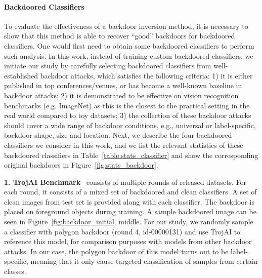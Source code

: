 \documentclass[10pt,twocolumn,letterpaper]{article}
\begin{document}
\paragraph{Backdoored Classifiers} To evaluate the effectiveness of a backdoor inversion method, it is necessary to show that this method is able to recover ``good'' backdoors for backdoored classifiers. One would first need to obtain some backdoored classifiers to perform such analysis. In this work, instead of training custom backdoored classifiers, we initiate our study by carefully selecting backdoored classifiers from well-established backdoor attacks, which satisfies the following criteria: 1) it is either published in top conferences/venues, or has become a well-known baseline in backdoor attacks; 2) it is demonstrated to be effective on  vision recognition benchmarks (e.g. ImageNet) as this is the closest to the practical setting in the real world compared to toy datasets; 3) the collection of these backdoor attacks should cover a wide range of backdoor conditions, e.g., universal or label-specific, backdoor shape, size and location. Next, we describe the four backdoored classifiers we consider in this work, and we list the relevant statistics of these backdoored classifiers in Table~\ref{table:stats_classifier} and show the corresponding original backdoors in Figure~\ref{fig:stats_backdoor}.  

\noindent \textbf{1. TrojAI Benchmark}~\cite{darpa2021trojai} consists of multiple rounds of released datasets. For each round, it consists of a mixed set of backdoored and clean classifiers. A set of clean images from test set is provided along with each classifier. The backdoor is placed on foreground objects during training. A sample backdoored image can be seen in Figure~\ref{fig:backdoor_initial} middle. For our study, we randomly sample a classifier with polygon backdoor (round 4, id-00000131) and use TrojAI to reference this model, for comparison purposes with models from other backdoor attacks. In our case, the polygon backdoor of this model turns out to be label-specific, meaning that it only cause targeted classification of samples from certain classes.
\end{document}
